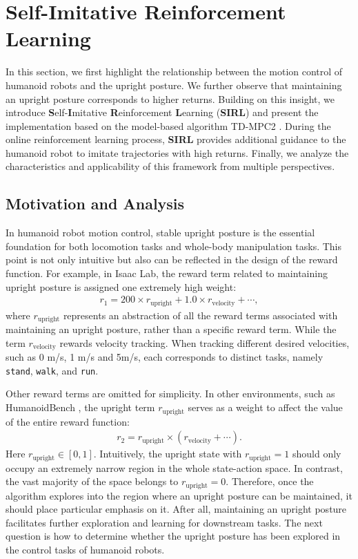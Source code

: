 \section{Self-Imitative Reinforcement Learning}
In this section, we first highlight the relationship between the motion control of humanoid robots and the upright posture. 
We further observe that maintaining an upright posture corresponds to higher returns. 
Building on this insight, we introduce \textbf{S}elf-\textbf{I}mitative \textbf{R}einforcement \textbf{L}earning (\textbf{SIRL}) and present the implementation based on the model-based algorithm TD-MPC2 \citep{hansen2023td}. 
During the online reinforcement learning process, \textbf{SIRL} provides additional guidance to the humanoid robot to imitate trajectories with high returns. 
Finally, we analyze the characteristics and applicability of this framework from multiple perspectives.

\subsection{Motivation and Analysis}

In humanoid robot motion control, stable upright posture is the essential foundation for both locomotion tasks and whole-body manipulation tasks. 
This point is not only intuitive but also can be reflected in the design of the reward function. 
For example, in Isaac Lab, the reward term related to maintaining upright posture is assigned one extremely high weight:
\begin{align}
    r_1 = 200 \times r_{\text{upright}} + 1.0 \times r_{\text{velocity}} + \cdots,
\end{align}
where $r_{\text{upright}}$ represents an abstraction of all the reward terms associated with maintaining an upright posture, rather than a specific reward term. 
While the term $r_{\text{velocity}}$ rewards velocity tracking.
When tracking different desired velocities, such as 0 m/s, 1 m/s and 5m/s, each corresponds to distinct tasks, namely \texttt{stand}, \texttt{walk}, and \texttt{run}.

Other reward terms are omitted for simplicity. 
In other environments, such as HumanoidBench \citep{sferrazza2024humanoidbench}, 
the upright term $r_{\text{upright}}$ serves as a weight to affect the value of the entire reward function: 
\begin{align}
   r_2 = r_{\text{upright}} \times \left(r_{\text{velocity}} + \cdots\right).
\end{align}
Here $r_{\text{upright}} \in [0, 1]$. 
Intuitively, the upright state with $r_{\text{upright}}=1$ should only occupy an extremely narrow region in the whole state-action space. 
In contrast, the vast majority of the space belongs to $r_{\text{upright}}=0$.
Therefore, once the algorithm explores into the region where an upright posture can be maintained, it should place particular emphasis on it. 
After all, maintaining an upright posture facilitates further exploration and learning for downstream tasks. 
The next question is how to determine whether the upright posture has been explored in the control tasks of humanoid robots.


